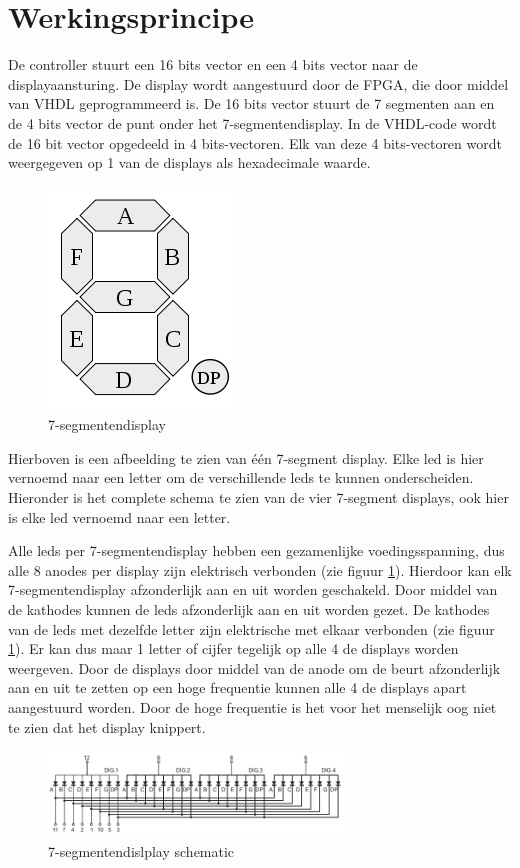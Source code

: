 \documentclass{report}
\begin{document}
\section{Werkingsprincipe}
De controller stuurt een 16 bits vector en een 4 bits vector naar de displayaansturing.
De display wordt aangestuurd door de FPGA, die door middel van VHDL geprogrammeerd is.
De 16 bits vector stuurt de 7 segmenten aan en de 4 bits vector de punt onder het 7-segmentendisplay.
In de VHDL-code wordt de 16 bit vector opgedeeld in 4 bits-vectoren.
Elk van deze 4 bits-vectoren wordt weergegeven op 1 van de displays als hexadecimale waarde.
\begin{figure}[H]
\centering
\includegraphics{7_segment_display.png}

\caption{7-segmentendisplay}
\end{figure}
Hierboven is een afbeelding te zien van \'{e}\'{e}n 7-segment display.
Elke led is hier vernoemd naar een letter om de verschillende leds te kunnen onderscheiden.
Hieronder is het complete schema te zien van de vier 7-segment displays, ook hier is elke led vernoemd naar een letter.

Alle leds per 7-segmentendisplay hebben een gezamenlijke voedingsspanning, dus alle 8 anodes per display zijn elektrisch verbonden (zie figuur \ref{fig:ssegschematic}).
Hierdoor kan elk 7-segmentendisplay afzonderlijk aan en uit worden geschakeld.
Door middel van de kathodes kunnen de leds afzonderlijk aan en uit worden gezet.
De kathodes van de leds met dezelfde letter zijn elektrische met elkaar verbonden (zie figuur \ref{fig:ssegschematic}).
Er kan dus maar 1 letter of cijfer tegelijk op alle 4 de displays worden weergeven.
Door de displays door middel van de anode om de beurt afzonderlijk aan en uit te zetten op een hoge frequentie kunnen alle 4 de displays apart aangestuurd worden.
Door de hoge frequentie is het voor het menselijk oog niet te zien dat het display knippert.
\begin{figure}[H]
\centering
\label{fig:ssegschematic}
\includegraphics[width=0.7\textwidth]{7_segment_display_schematic.png}

\caption{7-segmentendislplay schematic}
\end{figure}
\end{document}
